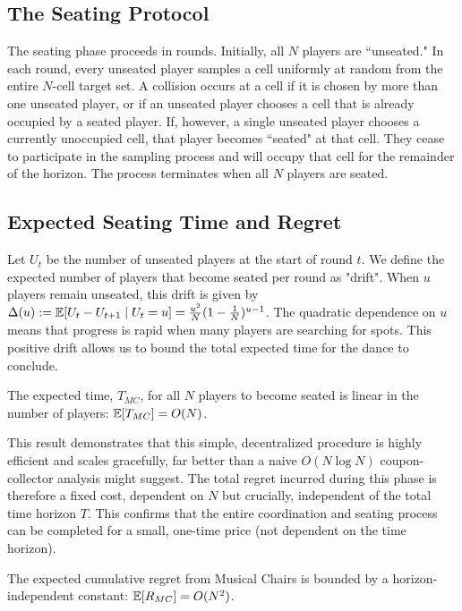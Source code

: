 \subsection{The Seating Protocol}
The seating phase proceeds in rounds. Initially, all $N$ players are ``unseated." In each round, every unseated player samples a cell uniformly at random from the entire $N$-cell target set. A collision occurs at a cell if it is chosen by more than one unseated player, or if an unseated player chooses a cell that is already occupied by a seated player. If, however, a single unseated player chooses a currently unoccupied cell, that player becomes ``seated" at that cell. They cease to participate in the sampling process and will occupy that cell for the remainder of the horizon. The process terminates when all $N$ players are seated.

\subsection{Expected Seating Time and Regret}
Let $U_t$ be the number of unseated players at the start of round $t$. We define the expected number of players that become seated per round as "drift". When $u$ players remain unseated, this drift is given by $\Delta(u) := \mathbb{E}[U_t - U_{t+1} \mid U_t=u] = \frac{u^2}{N}(1-\frac{1}{N})^{u-1}$. The quadratic dependence on $u$ means that progress is rapid when many players are searching for spots. This positive drift allows us to bound the total expected time for the dance to conclude.

\begin{theorem}
\label{thm:mc-time}
The expected time, $T_{MC}$, for all $N$ players to become seated is linear in the number of players: $\mathbb{E}[T_{MC}] = O(N)$.
\end{theorem}

This result demonstrates that this simple, decentralized procedure is highly efficient and scales gracefully, far better than a naive $O(N \log N)$ coupon-collector analysis might suggest. The total regret incurred during this phase is therefore a fixed cost, dependent on $N$ but crucially, independent of the total time horizon $T$. This confirms that the entire coordination and seating process can be completed for a small, one-time price (not dependent on the time horizon).

\begin{corollary}
\label{cor:mc-regret}
The expected cumulative regret from Musical Chairs is bounded by a horizon-independent constant: $\mathbb{E}[R_{MC}] = O(N^2)$.
\end{corollary}
